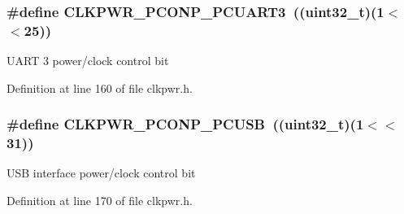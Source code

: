 \subsubsection[{\texorpdfstring{C\+L\+K\+P\+W\+R\+\_\+\+P\+C\+O\+N\+P\+\_\+\+P\+C\+U\+A\+R\+T3}{CLKPWR_PCONP_PCUART3}}]{\setlength{\rightskip}{0pt plus 5cm}\#define C\+L\+K\+P\+W\+R\+\_\+\+P\+C\+O\+N\+P\+\_\+\+P\+C\+U\+A\+R\+T3~(({\bf uint32\+\_\+t})(1$<$$<$25))}\hypertarget{group___c_l_k_p_w_r___public___macros_gab3c180bc0be3f8ddb32d526262ef0da6}{}\label{group___c_l_k_p_w_r___public___macros_gab3c180bc0be3f8ddb32d526262ef0da6}
U\+A\+RT 3 power/clock control bit 

Definition at line 160 of file clkpwr.\+h.

\subsubsection[{\texorpdfstring{C\+L\+K\+P\+W\+R\+\_\+\+P\+C\+O\+N\+P\+\_\+\+P\+C\+U\+SB}{CLKPWR_PCONP_PCUSB}}]{\setlength{\rightskip}{0pt plus 5cm}\#define C\+L\+K\+P\+W\+R\+\_\+\+P\+C\+O\+N\+P\+\_\+\+P\+C\+U\+SB~(({\bf uint32\+\_\+t})(1$<$$<$31))}\hypertarget{group___c_l_k_p_w_r___public___macros_ga05926f84706fa15dfc9228650d62ce26}{}\label{group___c_l_k_p_w_r___public___macros_ga05926f84706fa15dfc9228650d62ce26}
U\+SB interface power/clock control bit 

Definition at line 170 of file clkpwr.\+h.

